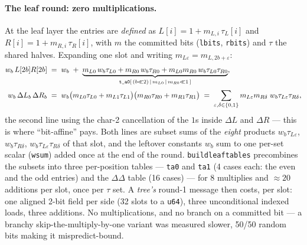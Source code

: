 \documentclass[11pt]{article}
\newcommand{\bits}{\{0,1\}}
\newcommand{\code}[1]{{\def\_{\textunderscore\allowbreak}\texttt{#1}}}
\theoremstyle{definition}
\begin{document}
\paragraph{The leaf round: zero multiplications.}
At the leaf layer the entries are \emph{defined} as
$L[i] = 1 + m_{L,i}\,\tau_L[i]$ and $R[i] = 1 + m_{R,i}\,\tau_R[i]$,
with $m$ the committed bits (\code{lbits}, \code{rbits}) and $\tau$ the
shared halves.  Expanding one slot and writing
$m_{L\varepsilon} = m_{L,2b+\varepsilon}$:
\begin{align*}
  w_b\,L[2b]R[2b]
  &\;=\; w_b \;+\;
     \underbrace{m_{L0}\,w_b\tau_{L0} + m_{R0}\,w_b\tau_{R0}
       + m_{L0}m_{R0}\,w_b\tau_{L0}\tau_{R0}}_{
       \code{t\_a0}[\,(b{\ll}2)\,|\,m_{L0}\,|\,m_{R0}{\ll}1\,]} , \\[2pt]
  w_b\,\Delta L_b\,\Delta R_b
  &\;=\; w_b\big(m_{L0}\tau_{L0} + m_{L1}\tau_{L1}\big)
         \big(m_{R0}\tau_{R0} + m_{R1}\tau_{R1}\big)
   \;=\; \sum_{\varepsilon,\delta \in \bits}
         m_{L\varepsilon}m_{R\delta}\; w_b\tau_{L\varepsilon}\tau_{R\delta} ,
\end{align*}
the second line using the char-2 cancellation of the $1$s inside
$\Delta L$ and $\Delta R$ --- this is where ``bit-affine'' pays.  Both
lines are subset sums of the \emph{eight} products
$w_b\tau_{L\varepsilon}$, $w_b\tau_{R\delta}$,
$w_b\tau_{L\varepsilon}\tau_{R\delta}$ of that slot, and the leftover
constants $w_b$ sum to one per-set scalar (\code{w\_sum}) added once at
the end of the round.  \code{build\_leaf\_tables} precombines the
subsets into three per-position tables --- \code{t\_a0} and
\code{t\_a1} (4 cases each: the even and the odd entries) and the
$\Delta\Delta$ table (16 cases) --- for 8 multiplies and ${\approx}20$
additions per slot, once per $\tau$ set.  A \emph{tree's} round-1
message then costs, per slot: one aligned 2-bit field per side (32 slots
to a \code{u64}), three unconditional indexed loads, three additions.
No multiplications, and no branch on a committed bit --- a branchy
skip-the-multiply-by-one variant was measured slower, 50/50 random bits
making it mispredict-bound.
\end{document}
